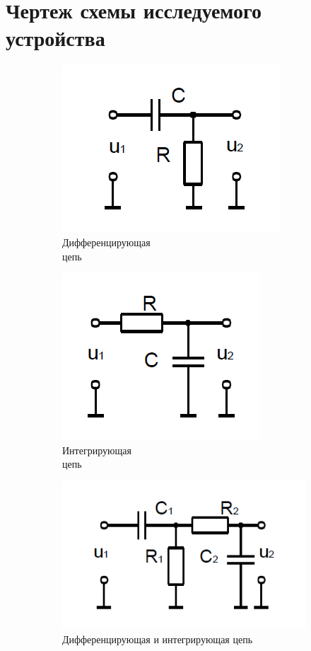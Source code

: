 \documentclass[a4paper,14pt]{extarticle}
\begin{document}
\section{Чертеж схемы исследуемого устройства}

\begin{figure}[H]\label{figure:2.1}
\begin{center}
	\begin{subfigure}[b]{0.34\textwidth}
		\includegraphics[scale=0.4]{diff}
		\caption{Дифференцирующая\\ цепь}
	\end{subfigure}
	\begin{subfigure}[b]{0.3\textwidth}
		\includegraphics[scale=0.4]{int}
		\caption{Интегрирующая\\ цепь}
	\end{subfigure}
	\begin{subfigure}[b]{0.3\textwidth}
		\includegraphics[scale=0.4]{diff-int}
		\captionsetup{justification=centering}
		\caption{Дифференцирующая и интегрирующая цепь}
	\end{subfigure}
	\caption{}
\end{center}
\end{figure}
\end{document}
